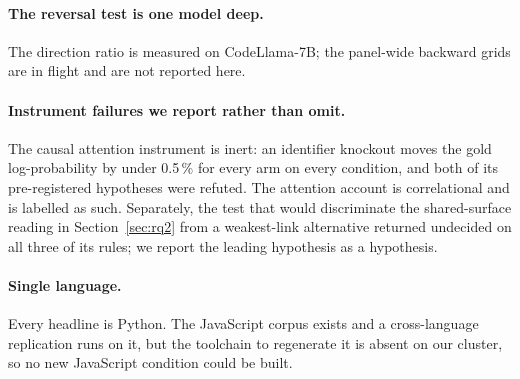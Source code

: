\paragraph{The reversal test is one model deep.} The direction ratio is measured on CodeLlama-7B;
the panel-wide backward grids are in flight and are not reported here.

\paragraph{Instrument failures we report rather than omit.} The causal attention instrument is
inert: an identifier knockout moves the gold log-probability by under 0.5\,\% for every arm on every
condition, and both of its pre-registered hypotheses were refuted. The attention account is
correlational and is labelled as such. Separately, the test that would discriminate the
shared-surface reading in Section~\ref{sec:rq2} from a weakest-link alternative returned undecided
on all three of its rules; we report the leading hypothesis as a hypothesis.

\paragraph{Single language.} Every headline is Python. The JavaScript corpus exists and a
cross-language replication runs on it, but the toolchain to regenerate it is absent on our cluster,
so no new JavaScript condition could be built.
